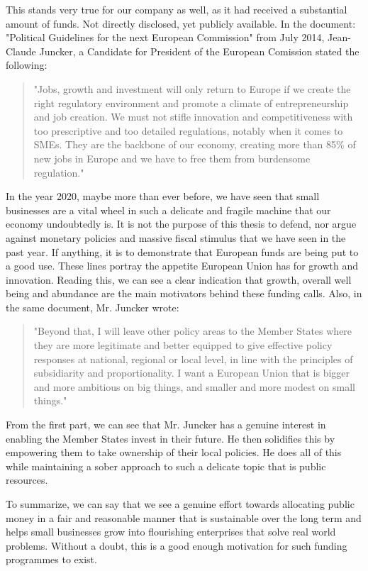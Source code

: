 \documentclass[12pt,oneside]{fithesis2}
\begin{document}
This stands very true for our company as well, as it had received a substantial amount of funds. Not directly disclosed, yet publicly available.\cite{mautilus-funding}
\newline\newline
In the document: "Political Guidelines for the next European Commission" from  July 2014, Jean-Claude Juncker, a Candidate for President of the European Comission stated the following: \blockquote{"Jobs, growth and investment will only return to Europe if we create the right regulatory environment and promote a climate of entrepreneurship and job creation. We must not stifle innovation and competitiveness with too prescriptive and too detailed regulations, notably when it comes to SMEs. They are the backbone of our economy, creating more than 85\% of new jobs in Europe and we have to free them from burdensome regulation."\cite{juncker-political-guidelines}}
In the year 2020, maybe more than ever before, we have seen that small businesses are a vital wheel in such a delicate and fragile machine that our economy undoubtedly is. It is not the purpose of this thesis to defend, nor argue against monetary policies and massive fiscal stimulus that we have seen in the past year. If anything, it is to demonstrate that European funds are being put to a good use. These lines portray the appetite European Union has for growth and innovation. Reading this, we can see a clear indication that growth, overall well being and abundance are the main motivators behind these funding calls.
\newline\newline
Also, in the same document, Mr. Juncker wrote: \blockquote{"Beyond that, I will leave other policy areas to the Member States where they are more legitimate and better equipped to give effective policy responses at national, regional or local level, in line with the principles of subsidiarity and proportionality. I want a European Union that is bigger and more ambitious on big things, and smaller and more modest on small things."\cite{juncker-political-guidelines}}
From the first part, we can see that Mr. Juncker has a genuine interest in enabling the Member States invest in their future. He then solidifies this by empowering them to take ownership of their local policies. He does all of this while maintaining a sober approach to such a delicate topic that is public resources.

To summarize, we can say that we see a genuine effort towards allocating public money in a fair and reasonable manner that is sustainable over the long term and helps small businesses grow into flourishing enterprises that solve real world problems. Without a doubt, this is a good enough motivation for such funding programmes to exist.
\end{document}

